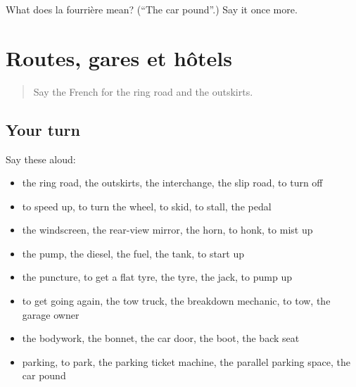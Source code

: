 \begin{tcolorbox}[breakable,colback=teal!4,colframe=teal!35!black,title={Before you move on}]
What does la fourrière mean? (\textquotedblleft{}The car pound\textquotedblright{}.) Say it once more.
\end{tcolorbox}
\section[(dialogue)]{Routes, gares et hôtels}

\label{lesson:FR-R407-revision-400-407}



\begin{quote}
Say the French for the ring road and the outskirts.
\end{quote}

\subsection*{Your turn}
Say these aloud:

\begin{itemize}
\raggedright
  \item the ring road, the outskirts, the interchange, the slip road, to turn off
  \item to speed up, to turn the wheel, to skid, to stall, the pedal
  \item the windscreen, the rear-view mirror, the horn, to honk, to mist up
  \item the pump, the diesel, the fuel, the tank, to start up
  \item the puncture, to get a flat tyre, the tyre, the jack, to pump up
  \item to get going again, the tow truck, the breakdown mechanic, to tow, the garage owner
  \item the bodywork, the bonnet, the car door, the boot, the back seat
  \item parking, to park, the parking ticket machine, the parallel parking space, the car pound
\end{itemize}

